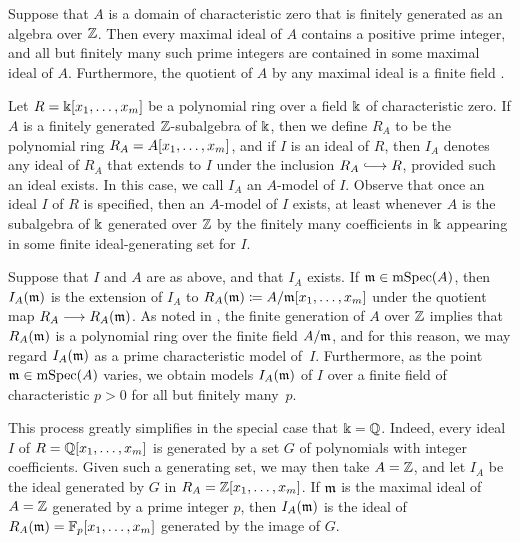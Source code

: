 \documentclass{amsart}
\begin{document}
\begin{remark}
   \label{maximal ideals: R}
   Suppose that $A$ is a domain of characteristic zero that is finitely generated as an algebra over $\mathbb{Z}$.
   Then every maximal ideal of $A$ contains a positive prime integer, and all but finitely many such prime integers are contained in some maximal ideal of $A$.
   Furthermore, the quotient of $A$ by any maximal ideal is a finite field \cite[V.3.4, Corollary~1]{bourbaki.commalg}.
\end{remark}

\begin{remark}
   \label{reduction: R}
   Let $R = \Bbbk[x_1, \ldots, x_m]$ be a polynomial ring over a field $\Bbbk$ of characteristic zero.
   If $A$ is a finitely generated $\mathbb{Z}$-subalgebra of $\Bbbk$, then we define $R_A$ to be the polynomial ring $R_A=A[x_1, \ldots, x_m]$, and if $I$ is an ideal of $R$, then $I_A$ denotes any ideal of $R_A$ that extends to $I$ under the inclusion $R_A \hooklongrightarrow R$, provided such an ideal exists.
   In this case, we call $I_A$ an $A$-model of $I$.
   Observe that once an ideal $I$ of $R$ is specified, then an $A$-model of $I$ exists, at least whenever $A$ is the subalgebra of $\Bbbk$ generated over $\mathbb{Z}$ by the finitely many coefficients in $\Bbbk$ appearing in some finite ideal-generating set for $I$.

   Suppose that $I$ and $A$ are as above, and that $I_A$ exists.
   If $\mathfrak{m} \in \operatorname{mSpec}(A)$, then $I_A(\mathfrak{m})$ is the extension of $I_A$ to $R_{A}(\mathfrak{m}) \coloneqq A/\mathfrak{m}[x_1, \ldots, x_m]$ under the quotient map $R_A \longrightarrow R_A(\mathfrak{m})$.
   As noted in , the finite generation of $A$ over $\mathbb{Z}$ implies that $R_A(\mathfrak{m})$ is a polynomial ring over the finite field $A/\mathfrak{m}$, and for this reason, we may regard $I_A(\mathfrak{m})$ as a prime characteristic model of~$I$.
   Furthermore, as the point $\mathfrak{m} \in \operatorname{mSpec}(A)$ varies, we obtain models $I_A(\mathfrak{m})$ of $I$ over a finite field of characteristic $p>0$ for all but finitely many~$p$.
\end{remark}

This process greatly simplifies in the special case that $\Bbbk=\mathbb{Q}$.  Indeed, every ideal $I$ of $R=\mathbb{Q}[x_1, \ldots, x_m]$ is generated by a set $G$ of polynomials with integer coefficients.  Given such a generating set, we may then take $A=\mathbb{Z}$, and let $I_A$ be the ideal generated by $G$ in $R_A=\mathbb{Z}[x_1, \ldots, x_m]$.  If  $\mathfrak{m}$ is the maximal ideal of $A=\mathbb{Z}$ generated by a prime integer $p$, then $I_A(\mathfrak{m})$ is the ideal of $R_A(\mathfrak{m}) = \mathbb{F}_p[x_1, \ldots, x_m]$  generated by the image of $G$.
\end{document}
